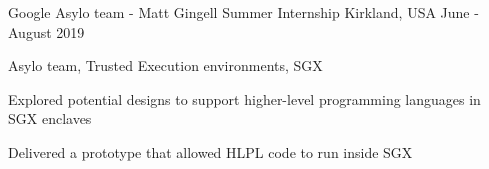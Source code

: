 


\begin{cventries}

\cventry
{Google Asylo team - Matt Gingell}
{Summer Internship}
{Kirkland, USA}
{June - August 2019}
{ 
  \begin{cvitems}
  \item{Asylo team, Trusted Execution environments, SGX}
	\item{Explored potential designs to support higher-level programming languages in SGX enclaves}
  \item{Delivered a prototype that allowed HLPL code to run inside SGX}
	\end{cvitems}
}

\end{cventries}
